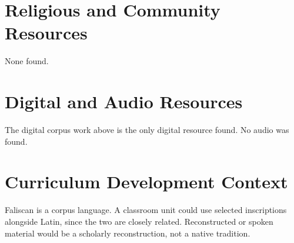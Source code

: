 \documentclass[12pt]{article}
\begin{document}
\section{Religious and Community Resources}
None found.

\section{Digital and Audio Resources}
The digital corpus work above is the only digital resource found. No audio was found.

\section{Curriculum Development Context}
Faliscan is a corpus language. A classroom unit could use selected inscriptions alongside Latin, since the two are closely related. Reconstructed or spoken material would be a scholarly reconstruction, not a native tradition.
\end{document}
